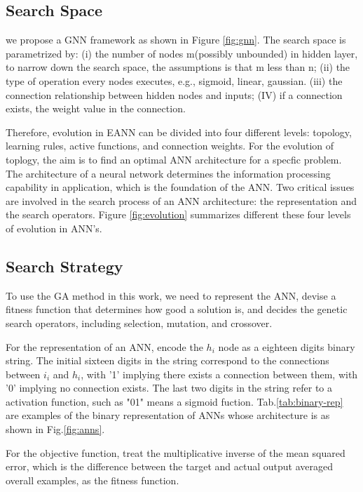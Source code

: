 \subsection{Search Space}
we propose a GNN framework as shown in Figure \ref{fig:gnn}. The search space
is parametrized by: (i) the number of nodes m(possibly unbounded) in hidden
layer, to narrow down the search space, the assumptions is that m less than n; (ii) the type of
operation every nodes executes, e.g., sigmoid, linear, gaussian. (iii) the
connection relationship between hidden nodes and inputs; (IV) if a connection
exists, the weight value in the connection.

Therefore, evolution in EANN can be divided into four different levels: topology, learning
rules, active functions, and connection weights. For the evolution of toplogy,
the aim is to find an optimal ANN architecture for a specfic problem. The
architecture of a neural network determines the information processing
capability in application, which is the foundation of the ANN. Two critical
issues are involved in the search process of an ANN architecture: the
representation and the search operators.
Figure \ref{fig:evolution} summarizes different these four levels of evolution in ANN's.



\subsection{Search Strategy}
To use the GA method in this work, we need to represent the ANN, devise a
fitness function that determines how good a solution is, and decides the
genetic search operators, including selection, mutation, and crossover.

For the representation of an ANN, encode the $h_i$ node as a eighteen digits
binary string. The initial sixteen digits in the string correspond to the
connections between $i_i$ and $h_i$, with '1' implying there exists a
connection between them, with '0' implying no connection exists. The last two
digits in the string refer to a activation function, such as "01" means a
sigmoid fuction.  Tab.\ref{tab:binary-rep} are examples of the binary
representation of ANNs whose architecture is as shown in
Fig.\ref{fig:anns}. 

For the objective function, treat the multiplicative inverse of the mean
squared error, which is the difference between the target and actual output
averaged overall examples, as the fitness function.

